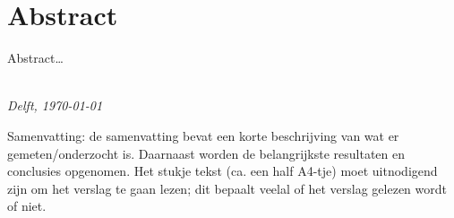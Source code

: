 \chapter*{Abstract}

Abstract\ldots

\begin{flushright}
{\makeatletter\itshape
    \@author \\
    Delft, \today
\makeatother}
\end{flushright}

Samenvatting: de samenvatting bevat een korte beschrijving van wat er gemeten/onderzocht is. Daarnaast worden de belangrijkste resultaten en conclusies opgenomen. Het stukje tekst (ca. een half A4-tje) moet uitnodigend zijn om het verslag te gaan lezen; dit bepaalt veelal of het verslag gelezen wordt of niet.

